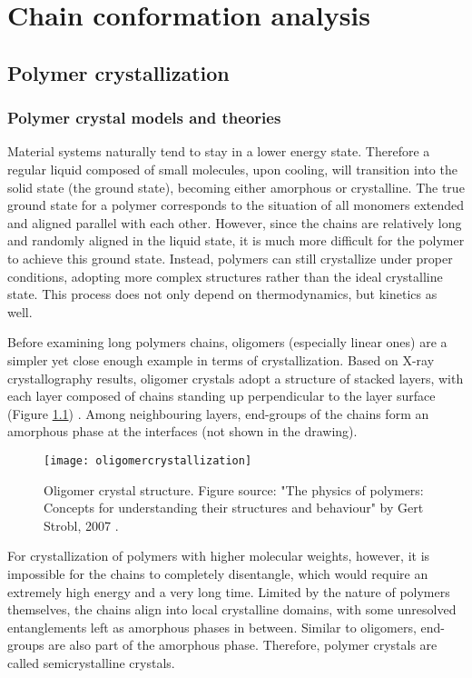 \chapter{Chain conformation analysis}\label{chap_analysis}
\graphicspath{{./analysis/graphs/}}

\section{Polymer crystallization}

\subsection{Polymer crystal models and theories}

Material systems naturally tend to stay in a lower energy state. Therefore a regular liquid composed of small molecules, upon cooling, will transition into the solid state (the ground state), becoming either amorphous or crystalline. The true ground state for a polymer corresponds to the situation of all monomers extended and aligned parallel with each other. However, since the chains are relatively long and randomly aligned in the liquid state, it is much more difficult for the polymer to achieve this ground state. Instead, polymers can still crystallize under proper conditions, adopting more complex structures rather than the ideal crystalline state. This process does not only depend on thermodynamics, but kinetics as well.

Before examining long polymers chains, oligomers (especially linear ones) are a simpler yet close enough example in terms of crystallization. Based on X-ray crystallography results, oligomer crystals adopt a structure of stacked layers, with each layer composed of chains standing up perpendicular to the layer surface (Figure \ref{fig:oligomercrystallization}) \cite{Strobl2007a}. Among neighbouring layers, end-groups of the chains form an amorphous phase at the interfaces (not shown in the drawing).

\begin{figure}[H]
\center
\texttt{[image: oligomercrystallization]}
\caption[Oligomer crystal structure.]{Oligomer crystal structure. Figure source: "The physics of polymers: Concepts for understanding their structures and behaviour" by Gert Strobl, 2007 \cite{Strobl2007a}.}
\label{fig:oligomercrystallization}
\end{figure}

For crystallization of polymers with higher molecular weights, however, it is impossible for the chains to completely disentangle, which would require an extremely high energy and a very long time. Limited by the nature of polymers themselves, the chains align into local crystalline domains, with some unresolved entanglements left as amorphous phases in between. Similar to oligomers, end-groups are also part of the amorphous phase. Therefore, polymer crystals are called semicrystalline crystals.

